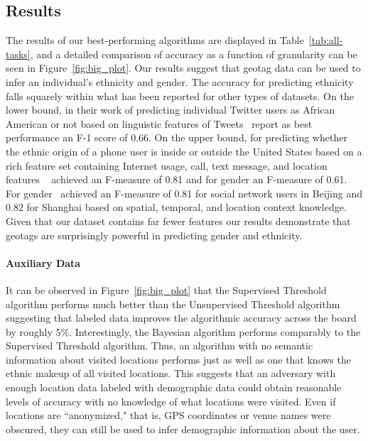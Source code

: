\subsection{Results}
\label{subsec:inference-results}

The results of our best-performing algorithms are displayed in Table~\ref{tab:all-tasks}, and a detailed comparison of accuracy as a function of granularity can be seen in Figure~\ref{fig:big_plot}.
Our results suggest that geotag data can be used to infer an individual's ethnicity and gender. The accuracy for predicting ethnicity falls squarely within what has been reported for other types of datasets. On the lower bound, in their work of predicting individual Twitter users as African American or not based on linguistic features of Tweets~\cite{ICWSM112886} report as best performance an F-1 score of 0.66. On the upper bound, for predicting whether the ethnic origin of a phone user is inside or outside the United States based on a rich feature set containing Internet usage, call, text message, and location features ~\cite{AltshulerAFEP12} achieved an F-measure of 0.81 and for gender an F-measure of 0.61. For gender~\cite{Zhong:2015:YYG:2684822.2685287} achieved an F-measure of 0.81 for social network users in Beijing and 0.82 for Shanghai based on spatial, temporal, and location context knowledge. Given that our dataset contains far fewer features our results demonstrate that geotags are surprisingly powerful in predicting gender and ethnicity. 

\paragraph{Auxiliary Data}

It can be observed in Figure~\ref{fig:big_plot} that the Supervised Threshold algorithm performs much better than the Unsupervised Threshold algorithm suggesting that labeled data improves the algorithmic accuracy across the board by roughly 5\%. Interestingly, the Bayesian algorithm performs comparably to the Supervised Threshold algorithm. Thus, an algorithm with no semantic information about visited locations performs just as well as one that knows the ethnic makeup of all visited locations. This suggests that an adversary with enough location data labeled with demographic data could obtain reasonable levels of accuracy with no knowledge of what locations were visited. Even if locations are ``anonymized," that is, GPS coordinates or venue names were obscured, they can still be used to infer demographic information about the user.

